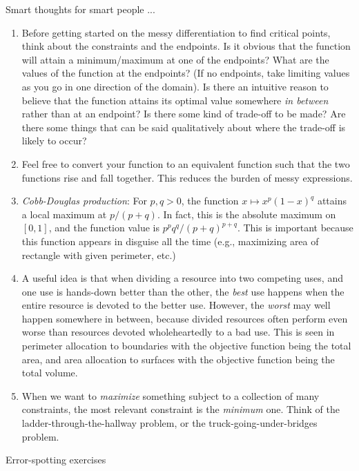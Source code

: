 \documentclass[10pt]{amsart}
\begin{document}
Smart thoughts for smart people ...

\begin{enumerate}
\item Before getting started on the messy differentiation to find
  critical points, think about the constraints and the endpoints. Is
  it obvious that the function will attain a minimum/maximum at one of
  the endpoints? What are the values of the function at the endpoints?
  (If no endpoints, take limiting values as you go in one direction of
  the domain). Is there an intuitive reason to believe that the
  function attains its optimal value somewhere {\em in between} rather
  than at an endpoint? Is there some kind of trade-off to be made? Are
  there some things that can be said qualitatively about where the
  trade-off is likely to occur?
\item Feel free to convert your function to an equivalent function
  such that the two functions rise and fall together. This reduces the
  burden of messy expressions.
\item {\em Cobb-Douglas production}: For $p,q > 0$, the function $x
  \mapsto x^p(1 - x)^q$ attains a local maximum at $p/(p + q)$. In
  fact, this is the absolute maximum on $[0,1]$, and the function
  value is $p^pq^q/(p + q)^{p + q}$. This is important because this function
  appears in disguise all the time (e.g., maximizing area of rectangle
  with given perimeter, etc.)
\item A useful idea is that when dividing a resource into two
  competing uses, and one use is hands-down better than the other, the
  {\em best} use happens when the entire resource is devoted to the
  better use. However, the {\em worst} may well happen somewhere in
  between, because divided resources often perform even worse than
  resources devoted wholeheartedly to a bad use. This is seen in
  perimeter allocation to boundaries with the objective function being
  the total area, and area allocation to surfaces with the objective
  function being the total volume.
\item When we want to {\em maximize} something subject to a collection
  of many constraints, the most relevant constraint is the {\em
  minimum} one. Think of the ladder-through-the-hallway problem, or
  the truck-going-under-bridges problem. 
\end{enumerate}

Error-spotting exercises
\end{document}
